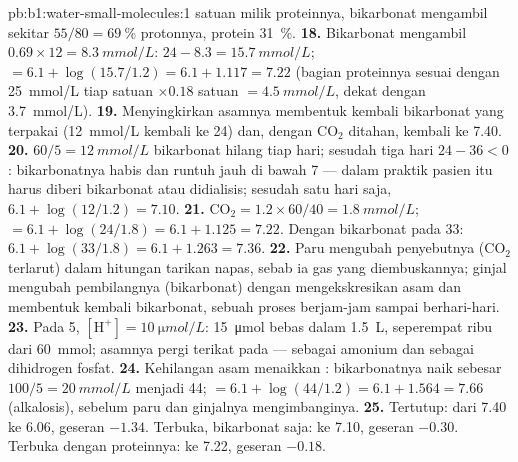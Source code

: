 \begin{solution}{pb:b1:water-small-molecules:1}
satuan milik proteinnya, bikarbonat mengambil sekitar
$55/80 = \qty{69}{\%}$ protonnya, protein \qty{31}{\%}.
\textbf{18.} Bikarbonat mengambil $0.69\times 12 = \qty{8.3}{mmol/L}$:
$24 - 8.3 = \qty{15.7}{mmol/L}$;  $= 6.1 + \log(15.7/1.2) = 6.1 +
1.117 = 7.22$ (bagian proteinnya sesuai dengan \qty{25}{mmol/L} tiap
satuan $\times 0.18$ satuan $= \qty{4.5}{mmol/L}$, dekat dengan
\qty{3.7}{mmol/L}).
\textbf{19.} Menyingkirkan asamnya membentuk kembali bikarbonat yang
terpakai (\qty{12}{mmol/L} kembali ke \qty{24}{}) dan, dengan
$\mathrm{CO_2}$ ditahan,  kembali ke 7.40.
\textbf{20.} $60/5 = \qty{12}{mmol/L}$ bikarbonat hilang tiap hari;
sesudah tiga hari $24 - 36 < 0$: bikarbonatnya habis dan  runtuh
jauh di bawah 7 --- dalam praktik pasien itu harus diberi bikarbonat
atau didialisis; sesudah satu hari saja, $6.1 + \log(12/1.2) =
7.10$.
\textbf{21.} $\mathrm{CO_2} = 1.2\times 60/40 = \qty{1.8}{mmol/L}$;
 $= 6.1 + \log(24/1.8) = 6.1 + 1.125 = 7.22$. Dengan bikarbonat pada
\qty{33}{}: $6.1 + \log(33/1.8) = 6.1 + 1.263 = 7.36$.
\textbf{22.} Paru mengubah penyebutnya ($\mathrm{CO_2}$ terlarut) dalam
hitungan tarikan napas, sebab ia gas yang diembuskannya; ginjal
mengubah pembilangnya (bikarbonat) dengan mengekskresikan asam dan
membentuk kembali bikarbonat, sebuah proses berjam-jam sampai berhari-hari.
\textbf{23.} Pada  5, $[\mathrm{H^+}] = \qty{10}{\micro mol/L}$: \qty{15}{\micro mol} bebas dalam \qty{1.5}{L}, seperempat ribu dari \qty{60}{mmol}; asamnya pergi terikat pada  --- sebagai amonium dan sebagai dihidrogen fosfat.
\textbf{24.} Kehilangan asam menaikkan : bikarbonatnya naik sebesar
$100/5 = \qty{20}{mmol/L}$ menjadi \qty{44}{};  $= 6.1 + \log(44/1.2) =
6.1 + 1.564 = 7.66$ (alkalosis), sebelum paru dan ginjalnya
mengimbanginya.
\textbf{25.} Tertutup: dari 7.40 ke 6.06, geseran $-1.34$. Terbuka,
bikarbonat saja: ke 7.10, geseran $-0.30$. Terbuka dengan proteinnya:
ke 7.22, geseran $-0.18$.
\end{solution}

